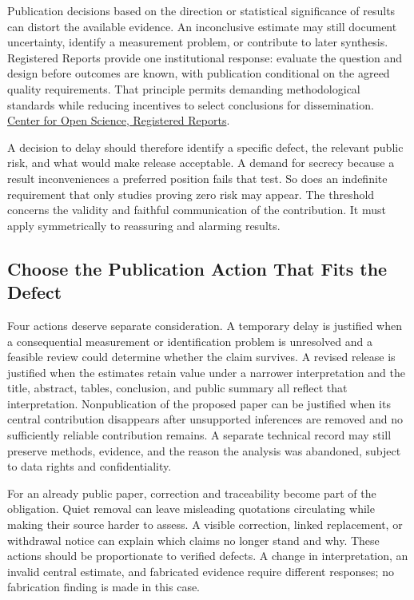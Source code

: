 Publication decisions based on the direction or statistical significance
of results can distort the available evidence. An inconclusive estimate
may still document uncertainty, identify a measurement problem, or
contribute to later synthesis. Registered Reports provide one
institutional response: evaluate the question and design before outcomes
are known, with publication conditional on the agreed quality
requirements. That principle permits demanding methodological standards
while reducing incentives to select conclusions for dissemination.
\href{https://www.cos.io/initiatives/registered-reports}{Center for Open
Science, Registered Reports}.

A decision to delay should therefore identify a specific defect, the
relevant public risk, and what would make release acceptable. A demand
for secrecy because a result inconveniences a preferred position fails
that test. So does an indefinite requirement that only studies proving
zero risk may appear. The threshold concerns the validity and faithful
communication of the contribution. It must apply symmetrically to
reassuring and alarming results.

\hypertarget{M09-choose-the-publication-action-that-fits-the-defect}{%
\subsection{Choose the Publication Action That Fits the
Defect}\label{M09-choose-the-publication-action-that-fits-the-defect}}

\noindent \noindent Four actions deserve separate consideration. A temporary delay
is justified when a consequential measurement or identification problem
is unresolved and a feasible review could determine whether the claim
survives. A revised release is justified when the estimates retain value
under a narrower interpretation and the title, abstract, tables,
conclusion, and public summary all reflect that interpretation.
Nonpublication of the proposed paper can be justified when its central
contribution disappears after unsupported inferences are removed and no
sufficiently reliable contribution remains. A separate technical record
may still preserve methods, evidence, and the reason the analysis was
abandoned, subject to data rights and confidentiality.

For an already public paper, correction and traceability become part of
the obligation. Quiet removal can leave misleading quotations
circulating while making their source harder to assess. A visible
correction, linked replacement, or withdrawal notice can explain which
claims no longer stand and why. These actions should be proportionate to
verified defects. A change in interpretation, an invalid central
estimate, and fabricated evidence require different responses; no
fabrication finding is made in this case.

